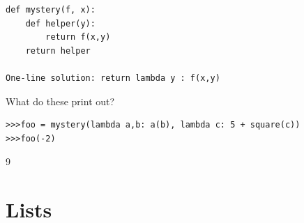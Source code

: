 \documentclass{exam}
\begin{document}
\begin{questions}
\begin{blocksection}
\begin{solution}[2in]
\begin{lstlisting}
def mystery(f, x):
    def helper(y):
        return f(x,y)
    return helper

One-line solution: return lambda y : f(x,y)
\end{lstlisting}
\end{solution}
\end{blocksection}

\question What do these print out?
\begin{lstlisting}
>>>foo = mystery(lambda a,b: a(b), lambda c: 5 + square(c))
>>>foo(-2)
\end{lstlisting}

\begin{solution}
9
\end{solution}

\end{questions}

\section{Lists}
\end{document}
